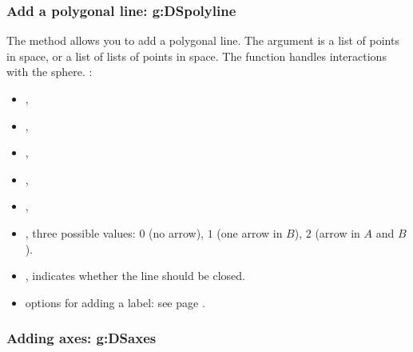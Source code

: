     
\subsubsection{ Add a polygonal line: g:DSpolyline}

The  method allows you to add a polygonal line. The argument  is a list of points in space, or a list of lists of points in space. The function handles interactions with the sphere. \writeoptions:
\begin{itemize}
    \item {},
    \item {},
    \item {},
    \item {},
    \item {},
    \item {}, three possible values: $0$ (no arrow), $1$ (one arrow in $B$), $2$ (arrow in $A$ and $B$).
    \item {}, indicates whether the line should be closed.
    \item options for adding a label: see page \pageref{addlabel}.
\end{itemize}

\subsubsection{Adding axes: g:DSaxes}

